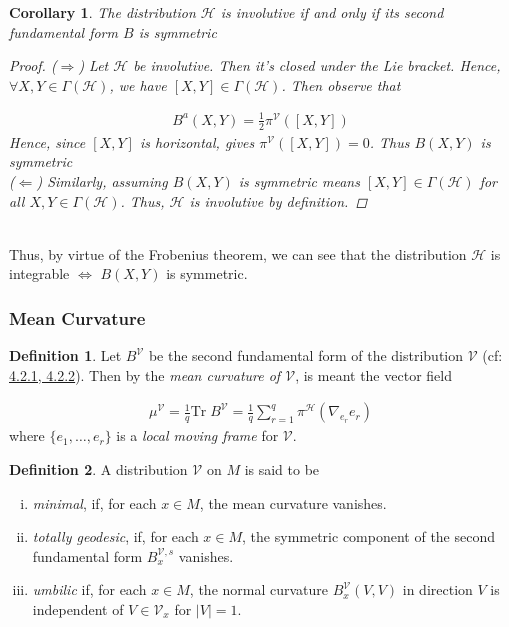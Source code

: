 \documentclass[12pt]{article}
\newtheorem{corollary}{Corollary}[theorem]
\theoremstyle{definition}
\newtheorem{definition}{Definition}[section]
\numberwithin{equation}{subsection}
\begin{document}
\begin{corollary}
The distribution $\mathcal{H}$ is involutive if and only if its second fundamental form $B$ is symmetric

\begin{proof}
($\Rightarrow$) Let $\mathcal{H}$ be involutive. Then it's closed under the Lie bracket. Hence, $\forall X,Y \in \Gamma(\mathcal{H})$, we have $[X,Y] \in \Gamma(\mathcal{H})$. Then observe that

\begin{align*}
    B^a(X,Y) = \frac{1}{2} \pi^{\mathcal{V}}([X,Y])
\end{align*}
Hence, since $[X,Y]$ is horizontal, gives $\pi^{\mathcal{V}}([X,Y]) = 0 $. Thus $B(X,Y)$ is symmetric \\

($\Leftarrow$) Similarly, assuming $B(X,Y)$ is symmetric means $ [X,Y] \in \Gamma(\mathcal{H})$ for all $X,Y \in \Gamma(\mathcal{H})$. Thus,  $\mathcal{H}$ is involutive by definition.
\end{proof}
\end{corollary}\\
\vspace{1cm}
Thus, by virtue of the Frobenius theorem, we can see that the distribution $\mathcal{H}$ is integrable $\iff$ $B(X,Y)$ is symmetric.

\subsubsection{Mean Curvature}
\begin{definition}
Let $B^{\mathcal{V}}$ be the second fundamental form of the distribution $\mathcal{V}$ (cf: \hyperref[eq:26]{4.2.1, 4.2.2}). Then by the \textit{mean curvature of $\mathcal{V}$}, is meant the vector field

\begin{align}\label{eq: meanC}
    \mu^{\mathcal{V}} = \frac{1}{q} \text{Tr} \; B^{\mathcal{V}} = \frac{1}{q} \sum_{r=1}^q \pi^{\mathcal{H}}(\nabla_{e_r} e_r)
\end{align}
where $\{ e_1 , \dots , e_r \}$ is a \textit{local moving frame} for $\mathcal{V}$.
\end{definition}

\begin{definition}
A distribution $\mathcal{V}$ on $M$ is said to be
\begin{enumerate}[(i)]
    \item \textit{minimal}, if, for each $x \in M$, the mean curvature vanishes.
    \item \textit{totally geodesic}, if, for each $x \in M$, the symmetric component of the second fundamental form $B_x^{\mathcal{V} , s}$ vanishes.
    \item \textit{umbilic} if, for each $x \in M$, the normal curvature $B^{\mathcal{V}}_x (V, V)$ in direction $V$ is independent of $V \in \mathcal{V}_x$ for $|V| = 1$.
\end{enumerate}
\end{definition}
\end{document}
